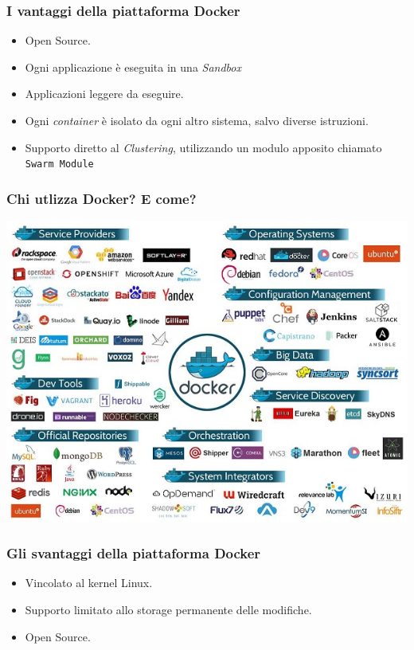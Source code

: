 \documentclass{beamer}
\begin{document}
\begin{frame}
\frametitle{I vantaggi della piattaforma Docker}
\begin{itemize}
\item Open Source.
\item Ogni applicazione è eseguita in una \textit{Sandbox}
\item Applicazioni leggere da eseguire.
\item Ogni \textit{container} è isolato da ogni altro sistema, salvo diverse istruzioni.
\item Supporto diretto al \textit{Clustering}, utilizzando un modulo apposito chiamato \texttt{Swarm Module}
\end{itemize}
\end{frame}

\begin{frame}
\frametitle{ Chi utlizza Docker? E come?}
\centering\includegraphics{pic4}
\end{frame}

\begin{frame}
\frametitle{Gli svantaggi della piattaforma Docker}
\begin{itemize}
\item Vincolato al kernel Linux.
\item Supporto limitato allo storage permanente delle modifiche.
\item Open Source.
\end{itemize}
\end{frame}
\end{document}
